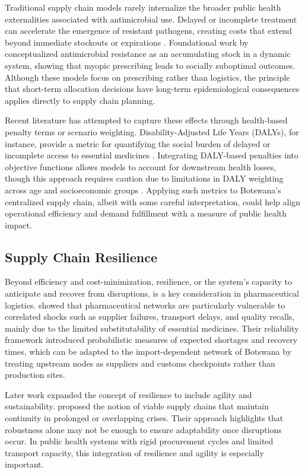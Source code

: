 \documentclass{article}
\begin{document}
Traditional supply chain models rarely internalize the broader public health externalities associated with antimicrobial use. Delayed or incomplete treatment can accelerate the emergence of resistant pathogens, creating costs that extend beyond immediate stockouts or expirations \cite{lax13}. Foundational work by \cite{lax01} conceptualized antimicrobial resistance as an accumulating stock in a dynamic system, showing that myopic prescribing leads to socially suboptimal outcomes. Although these models focus on prescribing rather than logistics, the principle that short-term allocation decisions have long-term epidemiological consequences applies directly to supply chain planning.

Recent literature has attempted to capture these effects through health-based penalty terms or scenario weighting. Disability-Adjusted Life Years (DALYs), for instance, provide a metric for quantifying the social burden of delayed or incomplete access to essential medicines \cite{dar21}. Integrating DALY-based penalties into objective functions allows models to account for downstream health losses, though this approach requires caution due to limitations in DALY weighting across age and socioeconomic groups \cite{arne99}. Applying such metrics to Botswana’s centralized supply chain, albeit with some careful interpretation, could help align operational efficiency and demand fulfillment with a measure of public health impact.

\subsection{Supply Chain Resilience}

Beyond efficiency and cost-minimization, resilience, or the system's capacity to anticipate and recover from disruptions, is a key consideration in pharmaceutical logistics. \cite{tkr22} showed that pharmaceutical networks are particularly vulnerable to correlated shocks such as supplier failures, transport delays, and quality recalls, mainly due to the limited substitutability of essential medicines. Their reliability framework introduced probabilistic measures of expected shortages and recovery times, which can be adapted to the import-dependent network of Botswana by treating upstream nodes as suppliers and customs checkpoints rather than production sites.

Later work expanded the concept of resilience to include agility and sustainability. \cite{ivanov22} proposed the notion of viable supply chains that maintain continuity in prolonged or overlapping crises. Their approach highlights that robustness alone may not be enough to ensure adaptability once disruptions occur. In public health systems with rigid procurement cycles and limited transport capacity, this integration of resilience and agility is especially important.
\end{document}
